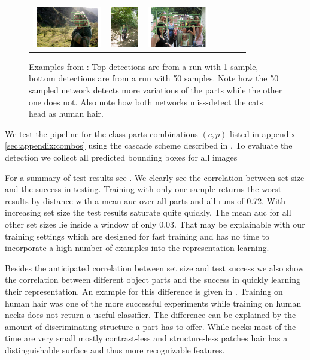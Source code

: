 \begin{figure}[htb]
\begin{tabular}{ccccccc}
      \includegraphics[height=1.8cm]{figures/hm_examples/50s_bbox_2009_005222} &
      \includegraphics[height=1.8cm]{figures/hm_examples/50s_bbox_2009_002715} &
      \includegraphics[height=1.8cm]{figures/hm_examples/50s_bbox_2010_005967}

    \end{tabular}
	\caption{Examples from : Top detections are from a run with 1 sample, bottom detections are from a run with 50 samples. Note how the 50 sampled network detects more variations of the parts while the other one does not. Also note how both networks miss-detect the cats head as human hair.}
  \label{fig:hm_examples}
\end{figure}
We test the pipeline for the class-parts combinations $(c,p)$ listed in appendix \ref{sec:appendix:combos} using the cascade scheme described in . To evaluate the detection we collect all predicted bounding boxes for all images

For a summary of test results see . We clearly see the correlation between set size and the success in testing. Training with only one sample returns the worst results by distance with a mean \gls{auc} over all parts and all runs of 0.72. With increasing set size the test results saturate quite quickly. The mean \gls{auc} for all other set sizes lie inside a window of only 0.03. That may be explainable with our training settings which are designed for fast training and has no time to incorporate a high number of examples into the representation learning.

Besides the anticipated correlation between set size and test success we also show the correlation between different object parts and the success in quickly learning their representation. An example for this difference is given in . Training on human hair was one of the more successful experiments while training on human necks does not return a useful classifier. The difference can be explained by the amount of discriminating structure a part has to offer. While necks most of the time are very small mostly contrast-less and structure-less patches hair has a distinguishable surface and thus more recognizable features.

